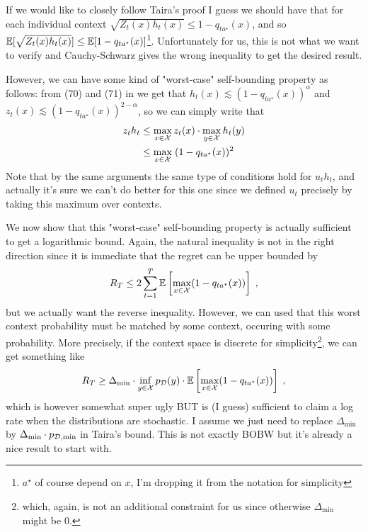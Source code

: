 If we would like to closely follow Taira's proof I guess we should have that for each individual context $\sqrt{Z_t(x) h_t(x)} \leq 1-q_{t a^\star}(x)$, and so $\mathbb{E}[\sqrt{Z_t(x) h_t(x)}] \leq \mathbb{E}[1-q_{t a^\star}(x)]$\footnote{$a^\star$ of course depend on $x$, I'm dropping it from the notation for simplicity}. Unfortunately for us, this is not what we want to verify and Cauchy-Schwarz gives the wrong inequality to get the desired result.

However, we can have some kind of "worst-case" self-bounding property as follows: from (70) and (71) in \cite{BOBWhardproblems} we get that $h_t(x)\lesssim (1-q_{ta^\star}(x))^\alpha$ and $z_t(x)\lesssim (1-q_{ta^\star}(x))^{2-\alpha}$, so we can simply write that 
\begin{align*}
	 z_t h_t & \leq \max_{x \in \mathcal{X}} z_t(x) \cdot \max_{y \in \mathcal{X}} h_t(y) \\
	& \leq \max_{x \in \mathcal{X}}\; (1-q_{ta^\star}(x))^2
\end{align*}
Note that by the same arguments the same type of conditions hold for $u_t h_t$, and actually it's sure we can't do better for this one since we defined $u_t$ precisely by taking this maximum over contexts.

We now show that this "worst-case" self-bounding property is actually sufficient to get a logarithmic bound. Again, the natural inequality is not in the right direction since it is immediate that the regret can be upper bounded by 
\[ R_T \leq 2\sum_{t=1}^T\mathbb{E}\left[\max_{x \in \mathcal{X}}(1-q_{ta^\star}(x))\right]\;, \]
but we actually want the reverse inequality. However, we can used that this worst context probability must be matched by some context, occuring with some probability. More precisely, if the context space is discrete for simplicity\footnote{which, again, is not an additional constraint for us since otherwise $\Delta_{\min}$ might be $0$.}, we can get something like 
\[R_T \geq \Delta_{\min} \cdot \inf_{y\in \mathcal{X}}p_{\mathcal{D}}(y)\cdot \mathbb{E}\left[\max_{x \in \mathcal{X}}(1-q_{ta^\star}(x))\right] \;,  \]
which is however somewhat super ugly BUT is (I guess) sufficient to claim a log rate when the distributions are stochastic. I assume we just need to replace $\Delta_{\min}$ by $\Delta_{\min} \cdot p_{\mathcal{D},\min}$ in Taira's bound. This is not exactly BOBW but it's already a nice result to start with. 


